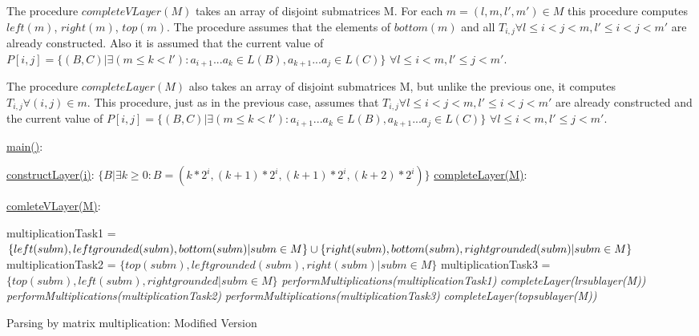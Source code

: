 \documentclass[runningheads]{llncs}
\begin{document}
The procedure $completeVLayer(M)$ takes an array of disjoint submatrices M. For each $m = (l, m, l', m') \in M$ this procedure computes $left(m)$, $right(m)$, $top(m)$. The procedure assumes that the elements of $bottom(m)$ and all $T_{i, j} \forall l \leq i < j < m,  l' \leq i < j < m'$ are already constructed. Also it is assumed that the current value of  $P[i, j] =  \{ (B, C) |\exists (m \le k < l'): a_{i + 1}...a_{k} \in L(B), a_{k + 1}...a_{j} \in L(C)\}$ $\forall l \leq i < m,  l' \leq j < m'$.
 
The procedure $completeLayer(M)$ also takes an array of disjoint submatrices M, but unlike the previous one, it computes $T_{i, j} \forall (i, j) \in m$. This procedure, just as in the previous case, assumes that  $T_{i, j} \forall l \leq i < j < m,  l' \leq i < j < m'$ are already constructed and the current value of  $P[i, j] =  \{ (B, C) |\exists (m \le k < l'): a_{i + 1}...a_{k} \in L(B), a_{k + 1}...a_{j} \in L(C)\}$ $\forall l \leq i < m,  l' \leq j < m'$.

\begin{algorithm}
\SetAlgoNoLine
{}
\underline{main()}{:}{
 
 \BlankLine
 }
 
\underline{constructLayer(i)}{:}{
 \BlankLine
 $\{B | \exists k \geq 0 : B = (k*2^i, (k+1)*2^i, (k + 1)*2^i, (k+2)*2^i) \}$
 \BlankLine
    }
\underline{completeLayer(M)}{:}{
\BlankLine
{}
\BlankLine
}
 
\underline{comleteVLayer(M)}{:}{
 \BlankLine
 multiplicationTask1 = $\{left(subm), leftgrounded(subm), bottom(subm) | subm \in M \} \cup \linebreak  \{right(subm), bottom(subm), rightgrounded(subm) | subm \in M\}$\;
 \BlankLine
 multiplicationTask2 = $\{top(subm), leftgrounded(subm), right(subm) | subm \in M\}$\;
 \BlankLine 
 multiplicationTask3 = $\{top(subm), left(subm), rightgrounded |subm \in M\}$\;
 \BlankLine
 \textit{performMultiplications(multiplicationTask1)}\;
 \textit{completeLayer(lrsublayer(M))}\;
 \textit{performMultiplications(multiplicationTask2)}\;
 \textit{performMultiplications(multiplicationTask3)}\;
 \textit{completeLayer(topsublayer(M))}
 
 }

\caption{Parsing by matrix multiplication: Modified Version}
\end{algorithm}
 
\end{document}
